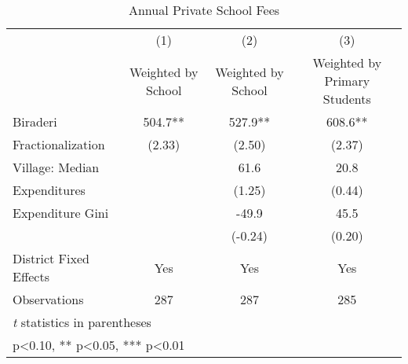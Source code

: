 \begin{table}[htbp]\centering
\def\sym#1{\ifmmode^{#1}\else\(^{#1}\)\fi}
\caption{Annual Private School Fees\label{fees}}
\begin{tabular}{l*{3}{c}}
\toprule
                &\multicolumn{1}{c}{(1)}&\multicolumn{1}{c}{(2)}&\multicolumn{1}{c}{(3)}\\
                &\multicolumn{1}{c}{Weighted by School}&\multicolumn{1}{c}{Weighted by School}&\multicolumn{1}{c}{Weighted by Primary Students}\\
\midrule
Biraderi        &    504.7** &    527.9** &    608.6** \\
Fractionalization&   (2.33)   &   (2.50)   &   (2.37)   \\
Village: Median &            &     61.6   &     20.8   \\
Expenditures    &            &   (1.25)   &   (0.44)   \\
Expenditure Gini&            &    -49.9   &     45.5   \\
                &            &  (-0.24)   &   (0.20)   \\
District Fixed Effects &      Yes   &      Yes   &      Yes   \\
\midrule
Observations    &      287   &      287   &      285   \\
\bottomrule
\multicolumn{4}{l}{\footnotesize \textit{t} statistics in parentheses}\\
\multicolumn{4}{l}{\footnotesize * p<0.10, ** p<0.05, *** p<0.01}\\
\end{tabular}
\end{table}
